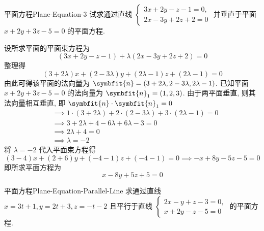 \begin{problem}{平面方程}{Plane-Equation-3}
    试求通过直线 $\begin{cases} 3x + 2y - z - 1 = 0, \\ 2x - 3y + 2z + 2 = 0 \end{cases}$ 并垂直于平面 $x + 2y + 3z - 5 = 0$ 的平面方程.
\end{problem}

\begin{solution}
    设所求平面的平面束方程为
    \begin{equation}
        (3x + 2y - z - 1) + \lambda(2x - 3y + 2z + 2) = 0
    \end{equation}
    整理得
    \begin{equation}
        (3 + 2\lambda)x + (2 - 3\lambda)y + (2\lambda - 1)z + (2\lambda - 1) = 0
    \end{equation}
    由此可得该平面的法向量为 $\symbfit{n} = (3 + 2\lambda, 2 - 3\lambda, 2\lambda - 1)$.
    已知平面 $x + 2y + 3z - 5 = 0$ 的法向量为 $\symbfit{n}_1 = (1, 2, 3)$.
    由于两平面垂直, 则其法向量相互垂直, 即 $\symbfit{n} \cdot \symbfit{n}_1 = 0$
    \begin{equation}
        \begin{aligned}
             & \implies 1 \cdot (3 + 2\lambda) + 2 \cdot (2 - 3\lambda) + 3 \cdot (2\lambda - 1) = 0 \\
             & \implies 3 + 2\lambda + 4 - 6\lambda + 6\lambda - 3 = 0                               \\
             & \implies 2\lambda + 4 = 0                                                             \\
             & \implies \lambda = -2
        \end{aligned}
    \end{equation}
    将 $\lambda = -2$ 代入平面束方程得
    \begin{equation}
        (3 - 4)x + (2 + 6)y + (-4 - 1)z + (-4 - 1) = 0 \implies -x + 8y - 5z - 5 = 0
    \end{equation}
    即所求平面方程为
    \begin{equation}
        \boxed{x - 8y + 5z + 5 = 0}
    \end{equation}
\end{solution}


\begin{problem}{平面方程}{Plane-Equation-Parallel-Line}
    求通过直线 $x = 3t+1, y = 2t+3, z = -t-2$ 且平行于直线 $\begin{cases} 2x - y + z - 3 = 0, \\ x + 2y - z - 5 = 0 \end{cases}$ 的平面方程.
\end{problem}

